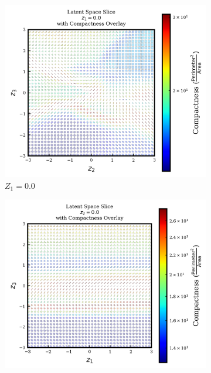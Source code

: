 \documentclass{article}
\begin{document}
\begin{figure}[H]
  \centering
  \begin{subfigure}{0.8\textwidth}
  \centering
    \includegraphics[height=0.3\textheight]{figures/VAEmodels/model2/fix_z1_0.0.png}
    \caption{$Z_1=0.0$}
    \label{fig:model2_fixz1_latent}
  \end{subfigure}
  \par\medskip
  \begin{subfigure}{0.8\textwidth}
  \centering
    \includegraphics[height=0.3\textheight]{figures/VAEmodels/model2/fix_z2_0.0.png}

\end{subfigure}
\end{figure}
\end{document}
